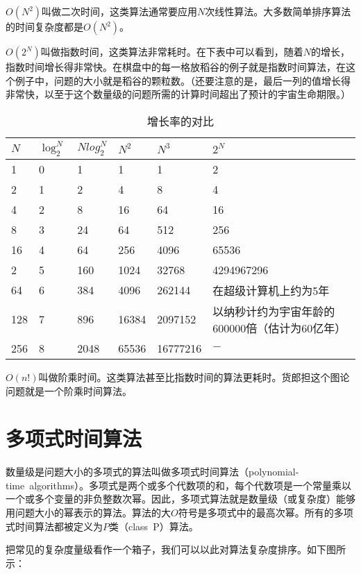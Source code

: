 $O(N^2)$叫做二次时间，这类算法通常要应用$N$次线性算法。大多数简单排序算法的时间复杂度都是$O(N^2)$。

$O(2^N)$叫做指数时间，这类算法非常耗时。在下表中可以看到，随着$N$的增长，指数时间增长得非常快。在棋盘中的每一格放稻谷的例子就是指数时间算法，在这个例子中，问题的大小就是稻谷的颗粒数。（还要注意的是，最后一列的值增长得非常快，以至于这个数量级的问题所需的计算时间超出了预计的宇宙生命期限。）

\begin{table}[!h]
\centering
\caption{增长率的对比}
\begin{tabular}{|p{25pt}|p{25pt}|p{25pt}|p{25pt}|p{40pt}|p{160pt}|}
\hline
$N$	&	$\log_2^N$	& $Nlog_2^N$	& $N^2$	& $N^3$	& $2^N$	\\
\hline
1		& 	0				& 1				& 1		& 1		& 2		\\
\hline
2		& 1				& 2				& 4		& 8		& 4		\\
\hline
4		& 2				& 8				& 16		& 64		& 16		\\
\hline
8		& 3				& 24				& 64		& 512		& 256		\\
\hline
16		& 4				& 64				& 256		& 4096	& 65536	\\
\hline
2		& 5				& 160				& 1024	& 32768	& 4294967296\\
\hline
64		& 6				& 384				& 4096	& 262144& 在超级计算机上约为5年\\
\hline
128	& 7				& 896				& 16384	& 2097152& 以纳秒计约为宇宙年龄的600000倍（估计为60亿年）\\
\hline
256	& 8				& 2048			& 65536	& 16777216	& $-$			\\
\hline
\end{tabular}
\end{table}

$O(n!)$叫做阶乘时间。这类算法甚至比指数时间的算法更耗时。货郎担这个图论问题就是一个阶乘时间算法。

\section{多项式时间算法}

数量级是问题大小的多项式的算法叫做多项式时间算法（polynomial-time~algorithms）。多项式是两个或多个代数项的和，每个代数项是一个常量乘以一个或多个变量的非负整数次幂。因此，多项式算法就是数量级（或复杂度）能够用问题大小的幂表示的算法。算法的大$O$符号是多项式中的最高次幂。所有的多项式时间算法都被定义为$P$类（class~P）算法。

把常见的复杂度量级看作一个箱子，我们可以以此对算法复杂度排序。如下图所示：

